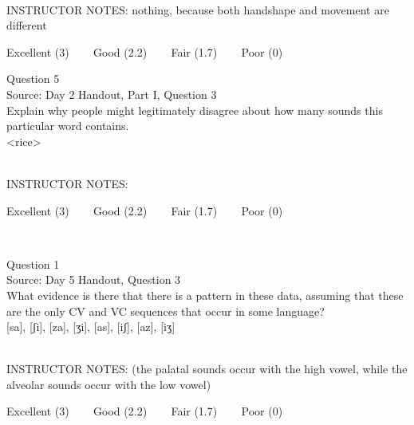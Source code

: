 \documentclass[12pt]{article}
\begin{document}
~\\
INSTRUCTOR NOTES: nothing, because both handshape and movement are different


\vfill
Excellent (3) ~~~ Good (2.2) ~~~ Fair (1.7) ~~~ Poor (0)
\newpage

{\large Question 5}\\

Source: Day 2 Handout, Part I, Question 3\\

Explain why people might legitimately disagree about how many sounds this particular word contains.\\

<rice>


~\\
INSTRUCTOR NOTES: 


\vfill
Excellent (3) ~~~ Good (2.2) ~~~ Fair (1.7) ~~~ Poor (0)
\newpage

\begin{center}
\textbf{{\color{red}{\HUGE END OF EXAM}}}\\

\end{center}
\newpage

\begin{center}
\textbf{{\color{blue}{\HUGE START OF EXAM\\}}}

\textbf{{\color{blue}{\HUGE Student ID: 6427\\}}}

\textbf{{\color{blue}{\HUGE 3:15 - 3:30 PM\\}}}

\end{center}
\newpage

{\large Question 1}\\

Source: Day 5 Handout, Question 3\\

What evidence is there that there is a pattern in these data, assuming that these are the only CV and VC sequences that occur in some language?\\

{[sa]}, {[ʃi]}, {[za]}, {[ʒi]}, {[as]}, {[iʃ]}, {[az]}, {[iʒ]}


~\\
INSTRUCTOR NOTES: (the palatal sounds occur with the high vowel, while the alveolar sounds occur with the low vowel)


\vfill
Excellent (3) ~~~ Good (2.2) ~~~ Fair (1.7) ~~~ Poor (0)
\newpage
\end{document}
